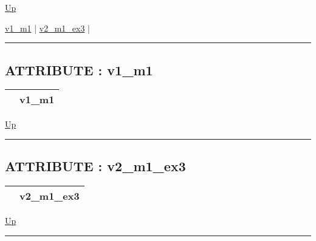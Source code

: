 \hyperlink{ecldoc:intest.inintest.Example_3}{Up}

\par


\hyperlink{ecldoc:intest.inintest.example_3.mod_1.v1_m1}{v1\_m1}  |
\hyperlink{ecldoc:intest.inintest.example_3.mod_1.v2_m1_ex3}{v2\_m1\_ex3}  |

\rule{\textwidth}{0.4pt}

\subsection*{ATTRIBUTE : v1\_m1}
\hypertarget{ecldoc:intest.inintest.example_3.mod_1.v1_m1}{}

{\renewcommand{\arraystretch}{1.5}
\begin{tabularx}{\textwidth}{|>{\raggedright\arraybackslash}l|X|}
\hline
\hspace{0pt} & v1\_m1 \\
\hline
\end{tabularx}
}

\hyperlink{ecldoc:intest.inintest.Example_3.mod_1}{Up}

\par


\rule{\textwidth}{0.4pt}
\subsection*{ATTRIBUTE : v2\_m1\_ex3}
\hypertarget{ecldoc:intest.inintest.example_3.mod_1.v2_m1_ex3}{}

{\renewcommand{\arraystretch}{1.5}
\begin{tabularx}{\textwidth}{|>{\raggedright\arraybackslash}l|X|}
\hline
\hspace{0pt} & v2\_m1\_ex3 \\
\hline
\end{tabularx}
}

\hyperlink{ecldoc:intest.inintest.Example_3.mod_1}{Up}

\par


\rule{\textwidth}{0.4pt}




